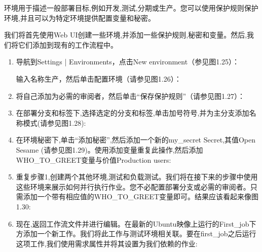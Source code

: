 
环境用于描述一般部署目标,例如开发,测试,分期或生产。您可以使用保护规则保护环境,并且可以为特定环境提供配置变量和秘密。


我们将首先使用Web UI创建一些环境,并添加一些保护规则,秘密和变量。然后,我们将它们添加到现有的工作流程中。


\begin{enumerate}
\item 
导航到Settings | Environments，点击New environment（参见图1.25）：


输入名称生产，然后单击配置环境（请参见图1.26）：


\item 
将自己添加为必需的审阅者，然后单击“保存保护规则”（请参见图1.27）：


\item 
在部署分支和标签下,选择选定的分支和标签,单击加号符号,并为主分支添加名称模式(请参见图1.28):


\item 
在环境秘密下,单击“添加秘密”,然后添加一个新的my\_secret Secret,其值Open Sesame (请参见图1.29)。使用添加变量重复此操作,然后添加WHO\_TO\_GREET变量与价值Production users:


\item 
重复步骤1,创建两个其他环境,测试和负载测试。我们将在接下来的步骤中使用这些环境来展示如何并行执行作业。您不必配置部署分支或必需的审阅者。只需添加一个带有相应值的WHO\_TO\_GREET变量即可。结果应该看起来像图1.30:


\item 
现在,返回工作流文件并进行编辑。在最新的Ubuntu映像上运行的First\_job下方添加一个新工作。我们将此工作与测试环境相关联。要在first\_job之后运行这项工作,我们使用需求属性并将其设置为我们依赖的作业:


\end{enumerate}
